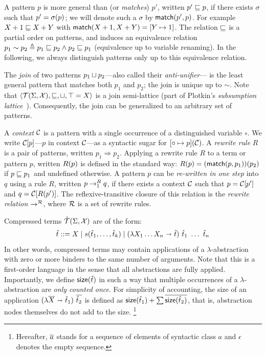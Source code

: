 A pattern $p$ is more general than (or \emph{matches}) $p'$,
written $p' \sqsubseteq p$,
if there exists $\sigma$ such that $p' = {\sigma}({p})$;
we will denote such a $\sigma$ by $\mathsf{match}(p',p)$.
%
For example $X + 1 \sqsubseteq X + Y$ with $\mathsf{match}(X + 1,X + Y) = [{Y} \mapsto {1}]$.
%
The relation $\sqsubseteq$ is a partial order on patterns,
and induces an equivalence relation $p_1 \sim p_2 \triangleq p_1 \sqsubseteq p_2 \wedge p_2 \sqsubseteq p_1$
(equivalence up to variable renaming).
%
In the following, we always distinguish patterns only up to this equivalence relation. 

The \emph{join} of two patterns $p_1 \sqcup p_2$---also called their \emph{anti-unifier}---%
is the least general pattern that matches both $p_1$ and $p_2$;
the join is unique up to $\sim$.
%
Note that $\langle \mathcal{T}(\Sigma,\mathcal{X}), \sqsubseteq, \sqcup, \top = X \rangle$ is a join semi-lattice
(part of Plotkin's \emph{subsumption lattice}~\cite{plotkin1970lattice}).
%
Consequently, the join can be generalized to an arbitrary set of patterns.

A \emph{context} $\mathcal{C}$ is a pattern with a single occurrence of a distinguished variable $\circ$.
%
We write $\mathcal{C}[p]$---$p$ in context $\mathcal{C}$---as a syntactic sugar for ${[{\circ} \mapsto {p}]}({\mathcal{C}})$.
%
A \emph{rewrite rule} $R$ is a pair of patterns, written $p_1 \Rightarrow p_2$.
%
Applying a rewrite rule $R$ to a term or pattern $p$, written ${R}({p})$ is defined in the standard way:
${R}({p}) = {(\mathsf{match}(p,p_1))}({p_2})$ if $p \sqsubseteq p_1$ and undefined otherwise.
%
A pattern $p$ can be \emph{re-written in one step} into $q$ using a rule $R$,
written $p \rightarrow^{R}_1 q$, 
if there exists a context $\mathcal{C}$ such that $p = \mathcal{C}[p']$ and $q = \mathcal{C}[{R}({p'})]$.
%
The reflexive-transitive closure of this relation is the \emph{rewrite relation} $\rightarrow^{\mathcal{R}}$,
where $\mathcal{R}$ is a set of rewrite rules.

%
Compressed terms $\hat{\mathcal{T}}(\Sigma,\mathcal{X})$ are of the form:
$$
\hat{t} ::= X   \mid   s(\hat{t}_1,\ldots,\hat{t}_k)     \mid (\lambda X_1 \ldots X_n \ \mathbf{\shortrightarrow}\  \hat{t})\ \hat{t}_1\ \ldots\ \hat{t}_n  
$$
In other words,
compressed terms may contain applications of a $\lambda$-abstraction with zero or more binders
to the same number of arguments.
%
Note that this is a first-order language in the sense that all abstractions are fully applied.
%
%
Importantly, we define $\mathsf{size}(\hat{t})$ in such a way 
that multiple occurrences of a $\lambda$-abstraction are \emph{only counted once}.
%
For simplicity of accounting, the size of an application $(\lambda \overline{X} \ \mathbf{\shortrightarrow}\  \hat{t}_1)\ \overline{\hat{t}_2}$
is defined as $\mathsf{size}(\hat{t}_1) + \sum{\overline{\mathsf{size}(\hat{t}_2)}}$,
that is, abstraction nodes themselves do not add to the size.%
\footnote{Hereafter, $\overline{a}$ stands for a sequence of elements of syntactic class $a$ and $\epsilon$ denotes the empty sequence.}  

